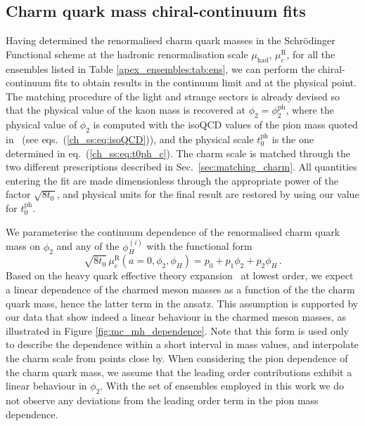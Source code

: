 
\subsection{Charm quark mass chiral-continuum fits}
\label{subsec:mc_chiral_continuum}

Having determined the  renormalised charm quark masses in the Schr\"odinger Functional scheme at the hadronic renormalisation scale $\mu_{\mathrm{had}}$, $\mu_c^{\textrm{R}}$, for all the ensembles listed in Table \ref{apex_ensembles:tab:ens}, we can perform the chiral-continuum fits to obtain results in the continuum limit and at the physical point. The matching procedure of the light
and strange sectors is already devised so that the physical value of the kaon mass is recovered
at $\phi_2 = \phi_2^{\mathrm{ph}}$, where the physical value of $\phi_2$ is computed
with the isoQCD values of the pion mass quoted 
in~\cite{FlavourLatticeAveragingGroupFLAG:2021npn} (see eqs.~(\ref{ch_ss:eq:isoQCD})), and the physical scale $t_0^{\mathrm{ph}}$
is the one determined in eq.~(\ref{ch_ss:eq:t0ph_c}). The charm scale is matched through the two different
prescriptions described in Sec.~\ref{sec:matching_charm}. All quantities entering the fit
are made dimensionless through the appropriate power of the factor $\sqrt{8t_0}$,
and physical units for the final result are restored by using our value for $t_0^{\mathrm{ph}}$.

We parameterise the continuum dependence of the renormalised charm quark mass on $\phi_2$
and any of the $\phi_H^{(i)}$ with the functional form
\begin{equation}
	\sqrt{8t_0}\, \mu_c^{\textrm{R}}(a=0, \phi_2, \phi_H) = p_0 + p_1\phi_2 + p_2\phi_H\,.
	\label{eq:mc_continuum_parameterization}
\end{equation}
Based on the heavy quark effective theory expansion~\cite{Georgi:1990um} at lowest order,
we expect a linear dependence of the charmed meson masses as a function of the the charm quark 
mass, hence the latter term in the ansatz. This assumption is supported by our data that show indeed a 
linear behaviour in the charmed meson masses, as illustrated in Figure \ref{fig:mc_mh_dependence}. Note that this form is used only to describe the dependence
within a short interval in mass values, and interpolate the charm scale from points close by. When considering the pion dependence of the charm quark mass, we assume that the  leading order contributions exhibit a linear behaviour in $\phi_2$. With the set of ensembles employed in this work we do not observe any deviations from the leading order term in the pion mass dependence.

